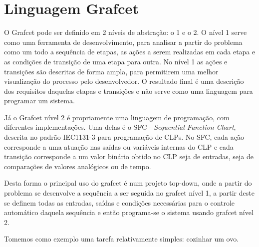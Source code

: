 \chapter{Linguagem Grafcet}
O Grafcet pode ser definido em 2 níveis de abstração: o 1 e o 2. O nível 1 serve como uma ferramenta de desenvolvimento, para analisar a partir do problema como um todo a sequência de etapas, as ações a serem realizadas em cada etapa e as condições de transição de uma etapa para outra. No nível 1 as ações e transições são descritas de forma ampla, para permitirem uma melhor visualização do processo pelo desenvolvedor. O resultado final é uma descrição dos requisitos daquelas etapas e transições e não serve como uma linguagem para programar um sistema.

Já o Grafcet nível 2 é propriamente uma linguagem de programação, com diferentes implementações. Uma delas é o SFC - \emph{Sequential Function Chart}, descrita no padrão IEC1131-3 para programação de CLPs. No SFC, cada ação corresponde a uma atuação nas saídas ou variáveis internas do CLP e cada transição corresponde a um valor binário obtido no CLP seja de entradas, seja de comparações de valores analógicos ou de tempo.

Desta forma o principal uso do grafcet é num projeto top-down, onde a partir do problema se desenvolve a sequência a ser seguida no grafcet nível 1, a partir deste se definem todas as entradas, saídas e condições necessárias para o controle automático daquela sequência e então programa-se o sistema usando grafcet nível 2.

Tomemos como exemplo uma tarefa relativamente simples: cozinhar um ovo.

